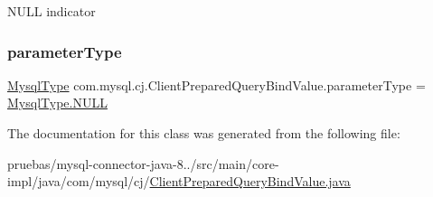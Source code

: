 N\+U\+LL indicator \mbox{\label{classcom_1_1mysql_1_1cj_1_1_client_prepared_query_bind_value_aa529f8247427184b1dfc546a6d795165}} 
\subsubsection{\texorpdfstring{parameter\+Type}{parameterType}}
{\footnotesize\ttfamily \mbox{\hyperlink{enumcom_1_1mysql_1_1cj_1_1_mysql_type}{Mysql\+Type}} com.\+mysql.\+cj.\+Client\+Prepared\+Query\+Bind\+Value.\+parameter\+Type = \mbox{\hyperlink{enumcom_1_1mysql_1_1cj_1_1_mysql_type_afd999a269aedd95acf6ae2453b95e2a3}{Mysql\+Type.\+N\+U\+LL}}\hspace{0.3cm}{\ttfamily [protected]}}



The documentation for this class was generated from the following file\+:\begin{DoxyCompactItemize}
\item 
pruebas/mysql-\/connector-\/java-\/8../src/main/core-\/impl/java/com/mysql/cj/\mbox{\hyperlink{_client_prepared_query_bind_value_8java}{Client\+Prepared\+Query\+Bind\+Value.\+java}}\end{DoxyCompactItemize}
